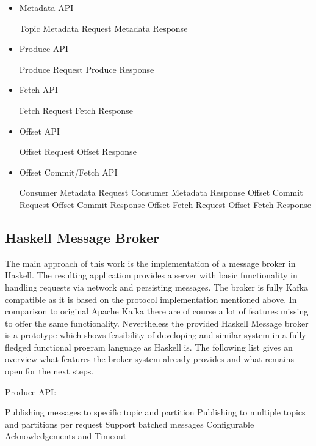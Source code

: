 \begin{itemize}
    \item Metadata API
    \begin{itemize}
        \tick Topic Metadata Request
        \tick Metadata Response
    \end{itemize}
    \item Produce API
    \begin{itemize}
        \tick Produce Request
        \tick Produce Response
    \end{itemize}
    \item Fetch API
    \begin{itemize}
        \tick Fetch Request
        \tick Fetch Response
    \end{itemize}
    \item Offset API
    \begin{itemize}
        \fail Offset Request
        \fail Offset Response
    \end{itemize}
    \item Offset Commit/Fetch API
    \begin{itemize}
        \fail Consumer Metadata Request
        \fail Consumer Metadata Response
        \fail Offset Commit Request
        \fail Offset Commit Response
        \fail Offset Fetch Request
        \fail Offset Fetch Response
    \end{itemize}
\end{itemize}

\subsection{Haskell Message Broker}
The main approach of this work is the implementation of a message broker in
Haskell. The resulting application provides a server with basic functionality
in handling requests via network and persisting messages. The broker is fully
Kafka compatible as it is based on the protocol implementation mentioned above.
In comparison to original Apache Kafka there are of course a lot of features
missing to offer the same functionality. Nevertheless the provided Haskell
Message broker is a prototype which shows feasibility of developing and similar
system in a fully-fledged functional program language as Haskell is.
The following list gives an overview what features the broker system already
provides and what remains open for the next steps.

Produce API:
\begin{itemize}
        \tick Publishing messages to specific topic and partition
        \tick Publishing to multiple topics and partitions per request
        \tick Support batched messages
        \fail Configurable Acknowledgements and Timeout
\end{itemize}


